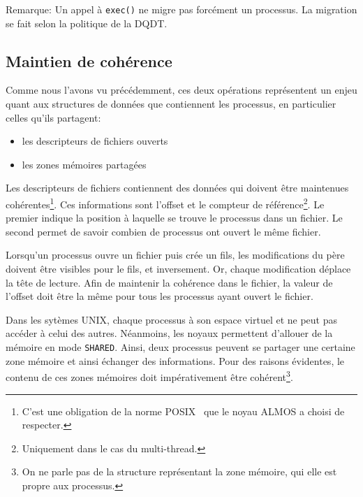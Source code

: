         \begin{paragraph}{Remarque:}
          Un appel à \texttt{exec()} ne migre pas forcément un processus. La
          migration se fait selon la politique de la DQDT.
        \end{paragraph}


    \subsection{Maintien de cohérence}

      Comme nous l'avons vu précédemment, ces deux opérations représentent un
      enjeu quant aux structures de données que contiennent les processus, en
      particulier celles qu'ils partagent:
      \begin{itemize}
      \item les descripteurs de fichiers ouverts
      \item les zones mémoires partagées
      \end{itemize}

      Les descripteurs de fichiers contiennent des données qui doivent être
      maintenues cohérentes\footnote{C'est une obligation de la norme
        POSIX~\citep{posix2013} que le noyau ALMOS a choisi de respecter.}. Ces
      informations sont l'offset et le compteur de référence\footnote{Uniquement
        dans le cas du multi-thread.}. Le premier indique la position à laquelle
      se trouve le processus dans un fichier. Le second permet de savoir combien
      de processus ont ouvert le même fichier.

      Lorsqu'un processus ouvre un fichier puis crée un fils, les modifications
      du père doivent être visibles pour le fils, et inversement. Or, chaque
      modification déplace la tête de lecture. Afin de maintenir la cohérence
      dans le fichier, la valeur de l'offset doit être la même pour tous les
      processus ayant ouvert le fichier.

      Dans les sytèmes UNIX, chaque processus à son espace virtuel et ne peut
      pas accéder à celui des autres. Néanmoins, les noyaux permettent d'allouer
      de la mémoire en mode \texttt{SHARED}. Ainsi, deux processus peuvent se
      partager une certaine zone mémoire et ainsi échanger des
      informations. Pour des raisons évidentes, le contenu de ces zones mémoires
      doit impérativement être cohérent\footnote{On ne parle pas de la structure
        représentant la zone mémoire, qui elle est propre aux processus.}.

